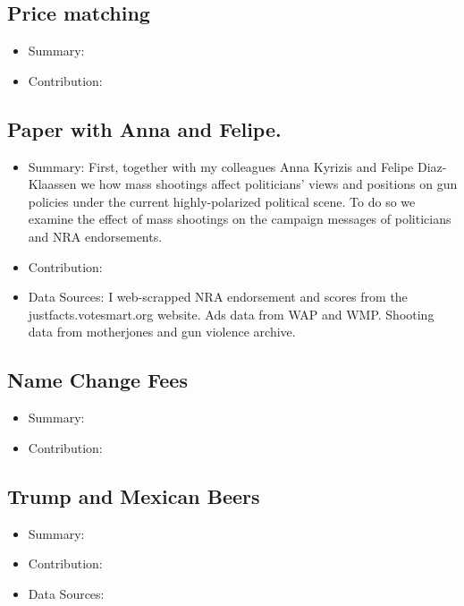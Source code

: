 \documentclass[12pt]{article}
\theoremstyle{plain}
\theoremstyle{plain}
\theoremstyle{plain}
\theoremstyle{plain}
\theoremstyle{plain}
\theoremstyle{plain}
\begin{document}
\subsection{Price matching}
\label{sec:org700ccaf}
\begin{itemize}
\item Summary:
\item Contribution:
\end{itemize}
\subsection{Paper with Anna and Felipe.}
\label{sec:orga2e807d}
\begin{itemize}
\item Summary:
First, together with my colleagues Anna Kyrizis and Felipe Diaz-Klaassen we how mass shootings affect politicians’ views
and positions on gun policies under the current highly-polarized political scene.
To do so we examine the effect of mass shootings on the campaign messages of politicians and NRA endorsements.

\item Contribution:
\item Data Sources:
I web-scrapped NRA endorsement and scores from the justfacts.votesmart.org website.
Ads data from WAP and WMP.
Shooting data from motherjones and gun violence archive.
\end{itemize}

\subsection{Name Change Fees}
\label{sec:orgb424dfd}
\begin{itemize}
\item Summary:
\item Contribution:
\end{itemize}
\subsection{Trump and Mexican Beers}
\label{sec:org9140d62}
\begin{itemize}
\item Summary:
\item Contribution:
\item Data Sources:
\end{itemize}
\end{document}
